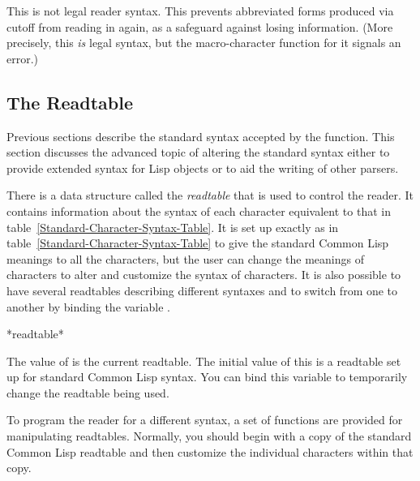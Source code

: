 \begin{flushdesc}
\item[\cd{\#)}]
This is not legal reader syntax.
This prevents abbreviated forms produced via  cutoff
from reading in again, as a safeguard against losing information.
(More precisely, this \emph{is} legal syntax, but the macro-character
function for it signals an error.)
\end{flushdesc}

\subsection{The Readtable}
\label{READTABLE-SECTION}

Previous sections describe the standard syntax accepted by the 
function.  This section discusses the advanced topic of altering the
standard syntax either to provide extended syntax for Lisp objects
or to aid the writing of other parsers.

There is a data structure called the \emph{readtable} that is used to
control the reader.  It contains information about the syntax of each
character equivalent to that in table~\ref{Standard-Character-Syntax-Table}.
It is set up exactly as in
table~\ref{Standard-Character-Syntax-Table} to give the standard Common Lisp
meanings to all the characters, but the user can change the meanings of
characters to alter and customize the syntax of characters.  It is also
possible to have several readtables describing different syntaxes and to
switch from one to another by binding the variable .

\begin{defun}[Variable]
*readtable*

The value of  is the current readtable.  The initial
value of this is a readtable set up for standard Common Lisp syntax.
You can bind this variable to temporarily change the readtable being used.
\end{defun}

To program the reader for a different syntax, a set of functions are
provided for manipulating readtables.  Normally, you should begin
with a copy of the standard Common Lisp readtable and then customize
the individual characters within that copy.

